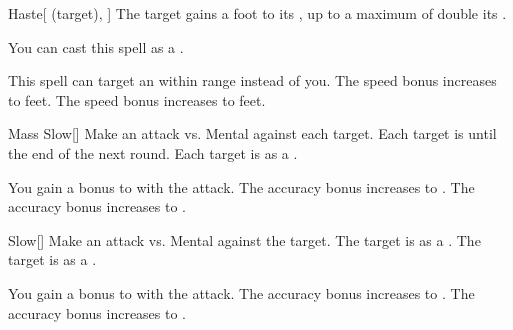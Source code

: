 \lowercase{\hypertarget{spell:Haste}{}}\label{spell:Haste}
\begin{attuneability}[Rank 1]{\hypertarget{spell:Haste}{Haste}}[ (target), ]
The target gains a  foot  to its , up to a maximum of double its .

You can cast this spell as a .

\rankline
{} This spell can target an  within \rngmed range instead of you.
 The speed bonus increases to  feet.
 The speed bonus increases to  feet.

\end{attuneability}
\vspace{0.25em}



\lowercase{\hypertarget{spell:Mass Slow}{}}\label{spell:Mass Slow}
\begin{freeability}[Rank 1]{\hypertarget{spell:Mass Slow}{Mass Slow}}[]
Make an attack vs. Mental against each target.
\hit Each target is  until the end of the next round.
\crit Each target is  as a .

\rankline
{} You gain a  bonus to  with the attack.
 The accuracy bonus increases to .
 The accuracy bonus increases to .

\end{freeability}
\vspace{0.25em}



\lowercase{\hypertarget{spell:Slow}{}}\label{spell:Slow}
\begin{freeability}[Rank 1]{\hypertarget{spell:Slow}{Slow}}[]
Make an attack vs. Mental against the target.
\hit The target is  as a .
\crit The target is  as a .

\rankline
{} You gain a  bonus to  with the attack.
 The accuracy bonus increases to .
 The accuracy bonus increases to .

\end{freeability}
\vspace{0.25em}




